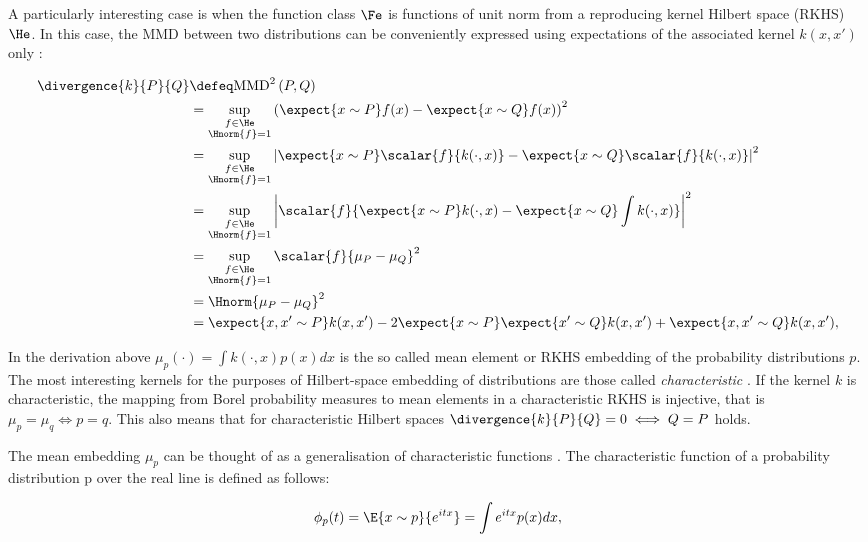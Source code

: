 A particularly interesting case is when the function class $\Fe$ is functions of unit norm from a reproducing kernel Hilbert space (RKHS) $\He$. In this case, the MMD between two distributions can be conveniently expressed using expectations of the associated kernel $k(x, x')$ only \citep{Sriperumbudur2010}:

\begin{align}
\divergence{k}{P}{Q} &\defeq \mbox{MMD}^2\left(P,Q\right)\\
	&= \sup_{\substack{f\in\He\\\Hnorm{f}=1}}\left( \expect{x\sim P} f(x) - \expect{x\sim Q} f(x) \right)^2\label{eqn:rkhs-mmd}\\
	&=  \sup_{\substack{f\in\He\\\Hnorm{f}=1}}\left\vert \expect{x\sim P}\scalar{f}{k(\cdot,x)} - \expect{x\sim Q} \scalar{f}{k(\cdot,x)} \right\vert^2\\
	&=  \sup_{\substack{f\in\He\\\Hnorm{f}=1}}\left\vert \scalar{f}{\expect{x\sim P} k(\cdot,x) - \expect{x\sim Q}\int k(\cdot,x)}\right\vert^2\\
	&=  \sup_{\substack{f\in\He\\\Hnorm{f}=1}}\scalar{f}{\mu_{P} - \mu_{Q}}^2\\
	&=  \Hnorm{\mu_{P} - \mu_{Q}}^2\\
	&=  \expect{x,x'\sim P} k(x,x')	- 2 \expect{x\sim P}\expect{x'\sim Q} k(x,x') + \expect{x,x'\sim Q} k(x,x'),\label{eqn:rkhs-mmd-lastline}
\end{align}

In the derivation above $\mu_p(\cdot) = \int k(\cdot,x) p(x) dx$ is the so called mean element or RKHS embedding of the probability distributions $p$. The most interesting kernels for the purposes of Hilbert-space embedding of distributions are those called \emph{characteristic} \citep{Sriperumbudur2008}. If the kernel $k$ is characteristic, the mapping from Borel probability measures to mean elements in a characteristic RKHS is injective, that is $\mu_p = \mu_q \iff p = q$. This also means that for characteristic Hilbert spaces $\divergence{k}{P}{Q} = 0 \iff Q=P$ holds.

The mean embedding $\mu_p$ can be thought of as a generalisation of characteristic functions \citep{Ord1999}. The characteristic function of a probability distribution p over the real line is defined as follows:

\begin{equation}
\phi_p(t) = \E{x\sim p}{e^{ i t x}} = \int e^{i t x} p(x) dx,
\end{equation}

